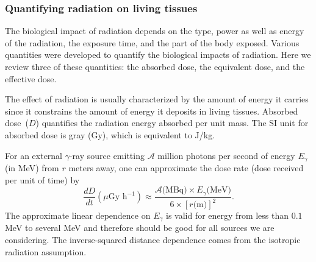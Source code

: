 \documentclass[nofootinbib,preprint,aps]{revtex4-1}
\begin{document}
        \subsubsection{Quantifying radiation on living tissues}
        The biological impact of radiation depends on the type, power as well as energy of the radiation, the
        exposure time, and the part of the body exposed. Various quantities were developed to
        quantify the biological impacts of radiation. Here we review three
        of these quantities: the absorbed dose, the equivalent dose, and the effective dose.

        The effect of radiation is usually characterized by the amount of energy it carries since it constrains
        the amount of energy it deposits in living tissues.
        Absorbed dose~($D$) quantifies the 
        radiation energy absorbed per unit mass. The SI unit for absorbed dose is gray (Gy), which is
        equivalent to J/kg.

        For an external $\gamma$-ray source emitting $\mathcal{A}$ million photons per second 
        of energy $E_{\gamma}$
        (in MeV) from $r$ meters away,
        one can approximate the dose rate (dose received per unit of time) by \cite[chapt. 7]{l01}
        \begin{equation}
            \frac{dD}{dt}(\mu\text{Gy h}^{-1}) \approx \frac{\mathcal{A}\text{(MBq)}\times E_{\gamma}\text{(MeV)}}
            {6\times [r\text{(m)}]^2}.
        \end{equation}
        The approximate linear dependence on $E_{\gamma}$ is valid for energy from less than $0.1$ MeV to several
        MeV and therefore should be good for all sources we are considering.\cite{my68}
        The inverse-squared distance dependence comes from the isotropic radiation assumption.
\end{document}
